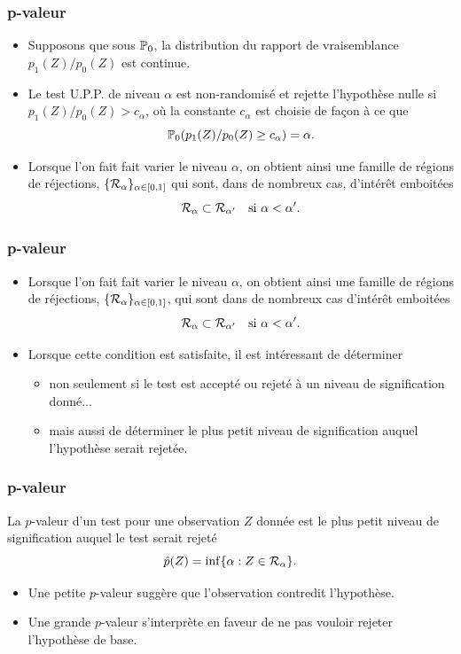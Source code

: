 \begin{frame}
\frametitle{p-valeur}
\begin{itemize}
\item Supposons que sous $\operatorname{{\mathbb P}}_0$, la distribution du rapport de vraisemblance $p_1(Z)/p_0(Z)$ est continue.
\item Le test U.P.P. de niveau $\alpha$ est non-randomisé et rejette l'hypothèse nulle si $p_1(Z)/p_0(Z) > c_\alpha$, où la constante $c_\alpha$ est choisie de façon à ce que
\[
\operatorname{{\mathbb P}}_0 ( p_1(Z)/ p_0(Z) \geq c_\alpha) = \alpha.
\]
\item Lorsque l'on fait fait varier le niveau $\alpha$, on obtient ainsi une famille de régions de réjections, $\{\mathcal{R}_\alpha\}_{\alpha \in \left[0,1\right]}$ qui sont, dans de nombreux cas, d'intérêt emboitées
    $$
    \mathcal{R}_\alpha \subset \mathcal{R}_{\alpha'} \quad \text{si $\alpha < \alpha'$}.
    $$
\end{itemize}
\end{frame}


\begin{frame}
\frametitle{p-valeur}
\begin{itemize}
\item Lorsque l'on fait fait varier le niveau $\alpha$, on obtient ainsi une famille de régions de réjections, $\{\mathcal{R}_\alpha\}_{\alpha \in \left[0,1\right]}$, qui sont dans de nombreux cas d'intérêt emboitées
    $$
    \mathcal{R}_\alpha \subset \mathcal{R}_{\alpha'} \quad \text{si $\alpha < \alpha'$}.
    $$
\item Lorsque cette condition est satisfaite, il est intéressant de déterminer
\begin{itemize}
\item non seulement si le test est \alert{accepté} ou \alert{rejeté} à un niveau de signification \alert{donné}...
\item mais aussi de déterminer \alert{le plus petit niveau de signification} auquel l'hypothèse serait rejetée.
\end{itemize}
\end{itemize}
\end{frame}

\begin{frame}
\frametitle{p-valeur}
\begin{definition}[p-valeur]
La $p$-valeur d'un test pour une observation $Z$ donnée est \alert{le plus petit niveau de signification} auquel le test serait rejeté
$$
\hat{p}(Z)= \inf\{ \alpha: Z \in \mathcal{R}_\alpha\}.
$$
\end{definition}
\begin{itemize}
\item Une \alert{petite} $p$-valeur suggère que l'observation \alert{contredit} l'hypothèse.
\item Une \alert{grande} $p$-valeur s'interprète en faveur de \alert{ne pas vouloir rejeter} l'hypothèse de base.
\end{itemize}
\end{frame}

